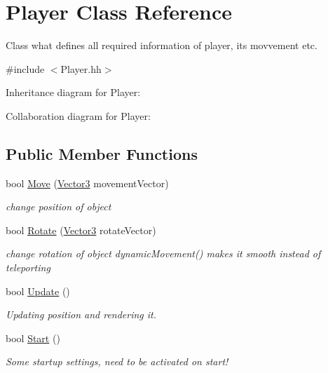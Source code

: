 \hypertarget{class_player}{}\section{Player Class Reference}
\label{class_player}


Class what defines all required information of player, its movvement etc.  




{\ttfamily \#include $<$Player.\+hh$>$}



Inheritance diagram for Player\+:


Collaboration diagram for Player\+:
\subsection*{Public Member Functions}
\begin{DoxyCompactItemize}
\item 
bool \hyperlink{class_player_a3fb29852d8ec3172353eba73529dd918}{Move} (\hyperlink{class_vector}{Vector3} movement\+Vector)
\begin{DoxyCompactList}\small\item\em change position of object \end{DoxyCompactList}\item 
bool \hyperlink{class_player_a8f9cb8556ae0bd45732c6f552e336c68}{Rotate} (\hyperlink{class_vector}{Vector3} rotate\+Vector)
\begin{DoxyCompactList}\small\item\em change rotation of object dynamic\+Movement() makes it smooth instead of teleporting \end{DoxyCompactList}\item 
bool \hyperlink{class_player_a91f887a024035be5030aa4b3384705fa}{Update} ()
\begin{DoxyCompactList}\small\item\em Updating position and rendering it. \end{DoxyCompactList}\item 
bool \hyperlink{class_player_a797198656a642b66fd8ec656153d8595}{Start} ()
\begin{DoxyCompactList}\small\item\em Some startup settings, need to be activated on start! \end{DoxyCompactList}\end{DoxyCompactItemize}
